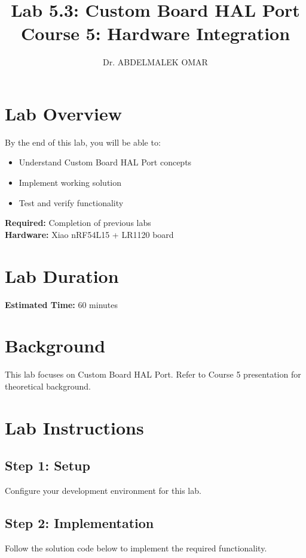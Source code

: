 \documentclass[11pt,a4paper]{article}
\title{\textbf{Lab 5.3: Custom Board HAL Port}\\
\large Course 5: Hardware Integration}
\author{Dr. ABDELMALEK OMAR}
\date{}
\begin{document}
\maketitle
\thispagestyle{fancy}

\section{Lab Overview}

\begin{objectivebox}
By the end of this lab, you will be able to:
\begin{itemize}
    \item Understand Custom Board HAL Port concepts
    \item Implement working solution
    \item Test and verify functionality
\end{itemize}
\end{objectivebox}

\begin{prereqbox}
\textbf{Required:} Completion of previous labs\\
\textbf{Hardware:} Xiao nRF54L15 + LR1120 board
\end{prereqbox}

\section{Lab Duration}
\textbf{Estimated Time:} 60 minutes

\section{Background}

This lab focuses on Custom Board HAL Port. Refer to Course 5 presentation for theoretical background.

\section{Lab Instructions}

\subsection{Step 1: Setup}
Configure your development environment for this lab.

\subsection{Step 2: Implementation}
Follow the solution code below to implement the required functionality.
\end{document}

